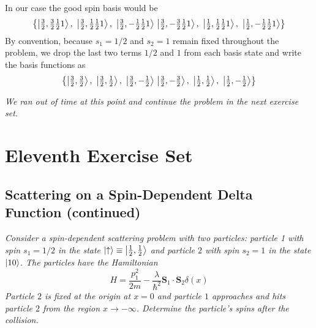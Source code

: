 \documentclass[11pt, a4paper]{article}
\renewcommand{\vec}[1]{\bm{#1}} %
\newcommand{\ua}{\uparrow}  %
\begin{document}
\begin{itemize}
\begin{enumerate}
		In our case the good spin basis would be
		\begin{equation*}
			\left\{ \ket{\tfrac{3}{2}, \tfrac{3}{2} \tfrac{1}{2} 1},\  \ket{\tfrac{3}{2}, \tfrac{1}{2} \tfrac{1}{2} 1},\  \ket{\tfrac{3}{2}, -\tfrac{1}{2} \tfrac{1}{2} 1} \, \ket{\tfrac{3}{2}, -\tfrac{3}{2} \tfrac{1}{2} 1},\ \ket{\tfrac{1}{2}, \tfrac{1}{2} \tfrac{1}{2} 1},\  \ket{\tfrac{1}{2}, -\tfrac{1}{2} \tfrac{1}{2} 1}  \right\}
		\end{equation*}
		By convention, because $ s_{1} = 1/2 $ and $ s_{2} = 1 $ remain fixed throughout the problem, we drop the last two terms $ 1/2 $ and $ 1 $ from each basis state and write the basis functions as
		\begin{equation*}
			\left\{ \ket{\tfrac{3}{2}, \tfrac{3}{2} },\  \ket{\tfrac{3}{2}, \tfrac{1}{2} },\  \ket{\tfrac{3}{2}, -\tfrac{1}{2} } \, \ket{\tfrac{3}{2}, -\tfrac{3}{2} },\ \ket{\tfrac{1}{2}, \tfrac{1}{2} },\  \ket{\tfrac{1}{2}, -\tfrac{1}{2}}  \right\}
		\end{equation*}
				
	\end{enumerate}
	\textit{We ran out of time at this point and continue the problem in the next exercise set.}	
\end{itemize}



\section{Eleventh Exercise Set}

\subsection{Scattering on a Spin-Dependent Delta Function (continued)}
\textit{Consider a spin-dependent scattering problem with two particles: particle 1 with spin $ s_{1} = 1/2 $ in the state $ \ket{\ua} \equiv \ket{\tfrac{1}{2}, \tfrac{1}{2}} $ and particle $ 2 $ with spin $ s_{2} = 1 $ in the state $ \ket{10} $. The particles have the Hamiltonian}
\begin{equation*}
	H = \frac{p_{1}^{2}}{2m} - \frac{\lambda}{\hbar^{2}}\vec{S}_{1}\cdot \vec{S}_{2}\delta(x)
\end{equation*}
\textit{Particle $ 2 $ is fixed at the origin at $ x = 0 $ and particle $ 1 $ approaches and hits particle $ 2 $ from the region $ x \to -\infty $. Determine the particle's spins after the collision.}
\end{document}
